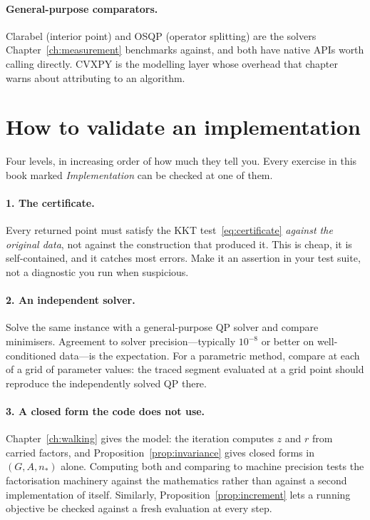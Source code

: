 \paragraph{General-purpose comparators.} Clarabel \cite{clarabel2024} (interior point)
and OSQP \cite{osqp} (operator splitting) are the solvers Chapter~\ref{ch:measurement}
benchmarks against, and both have native APIs worth calling directly. CVXPY
\cite{diamond2016} is the modelling layer whose overhead that chapter warns about
attributing to an algorithm.

\section{How to validate an implementation}

Four levels, in increasing order of how much they tell you. Every exercise in this book
marked \emph{Implementation} can be checked at one of them.

\paragraph{1. The certificate.} Every returned point must satisfy the KKT
test~\eqref{eq:certificate} \emph{against the original data}, not against the
construction that produced it. This is cheap, it is self-contained, and it catches most
errors. Make it an assertion in your test suite, not a diagnostic you run when
suspicious.

\paragraph{2. An independent solver.} Solve the same instance with a general-purpose QP
solver and compare minimisers. Agreement to solver precision---typically $10^{-8}$ or
better on well-conditioned data---is the expectation. For a parametric method, compare
at each of a grid of parameter values: the traced segment evaluated at a grid point
should reproduce the independently solved QP there.

\paragraph{3. A closed form the code does not use.} Chapter~\ref{ch:walking} gives the
model: the iteration computes $z$ and $r$ from carried factors, and
Proposition~\ref{prop:invariance} gives closed forms in $(G,A,n_*)$ alone. Computing
both and comparing to machine precision tests the factorisation machinery against the
mathematics rather than against a second implementation of itself. Similarly,
Proposition~\ref{prop:increment} lets a running objective be checked against a fresh
evaluation at every step.

